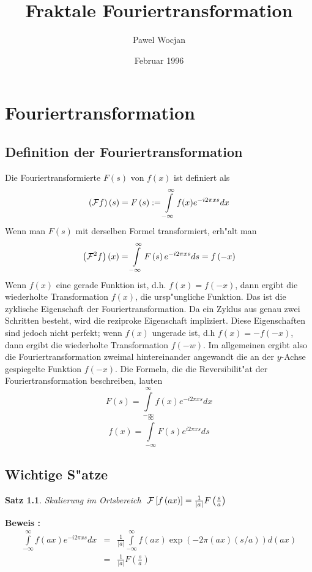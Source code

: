 \documentclass[11pt,twoside]{report}
\begin{document}
\newcommand{\iu}{\int\limits_{-\infty}^{\infty}}
\newcommand{\sq}{\sqrt{2\pi}x}
\newcommand{\sqs}{\sqrt{2\pi}s}

\newcommand{\ex}{e^{ -i2\pi xs }}
\newcommand{\es}{e^{  i2\pi xs }}

\newcommand{\h}{2^{1/4}}
\newcommand{\gx}{e^{ -\pi x^2 }}
\newcommand{\gs}{e^{ -\pi s^2 }}
\newcommand{\db}{\mbox{d}}
\newtheorem{satz}{Satz}

\title{Fraktale Fouriertransformation}
\author{Pawel Wocjan}
\date{Februar 1996}
\maketitle
\tableofcontents

\chapter{Fouriertransformation}
\section{Definition der Fouriertransformation}
Die Fouriertransformierte $F(s)$ von $f(x)$ ist definiert als
$$\left({\cal F}f \right) \left( s \right) = F\left( s \right) := \iu f(x)\ex  dx $$
Wenn man $F(s)$ mit derselben Formel transformiert, erh"alt man 
$$\left({\cal F}^2 f\right) \left( x \right) = \iu F\left( s \right)\ex ds = f\left( -x \right) $$
Wenn $f(x)$ eine gerade Funktion ist, d.h. $f(x)=f(-x)$, dann ergibt die wiederholte Transformation $f(x)$, die ursp"ungliche Funktion. Das ist die zyklische Eigenschaft der Fouriertransformation. Da ein Zyklus aus genau zwei Schritten besteht, wird die reziproke Eigenschaft impliziert. Diese Eigenschaften sind jedoch nicht perfekt; wenn $f(x)$ ungerade ist, d.h $f(x)=-f(-x)$, dann ergibt die wiederholte Transformation $f(-w)$. Im allgemeinen ergibt also die Fouriertransformation zweimal hintereinander angewandt die an der $y$-Achse gespiegelte Funktion $f(-x)$.
Die Formeln, die die Reversibilit"at der Fouriertransformation beschreiben, lauten
$$ F(s)=\iu f(x)\ex dx$$
$$ f(x)=\iu F(s)\es ds$$

\newpage
\section{Wichtige S"atze}
\vfill

\begin{satz}
Skalierung im Ortsbereich 
$ \; {\cal F}\left[ f\left( a x \right) \right] = \frac{1}{|a|} F\left({s \over a}\right) $
\end{satz}
{\bf Beweis :}
\begin{eqnarray*}  
  \iu f\left( ax \right) \ex dx & = & \frac{1}{|a|} \iu f\left( ax \right) \exp \left( -2\pi \left( ax \right) \left( s/a \right) \right) d \left( ax \right) \\ & = & \frac{1}{|a|} F \left( \frac{s}{a} \right) \\
\end{eqnarray*}
\vfill
\end{document}
